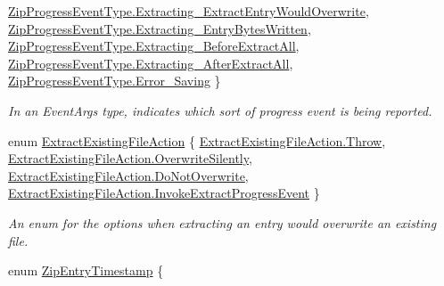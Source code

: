 \begin{DoxyCompactItemize}
\mbox{\hyperlink{namespace_super_tiled2_unity_1_1_ionic_1_1_zip_a6584db8196e626ddfc455e74d31a841faf76e96e54af22ba88a1e180a9c935f05}{Zip\+Progress\+Event\+Type.\+Extracting\+\_\+\+Extract\+Entry\+Would\+Overwrite}}, 
\newline
\mbox{\hyperlink{namespace_super_tiled2_unity_1_1_ionic_1_1_zip_a6584db8196e626ddfc455e74d31a841fab1d6fef4a55c43c15713a126b8471092}{Zip\+Progress\+Event\+Type.\+Extracting\+\_\+\+Entry\+Bytes\+Written}}, 
\mbox{\hyperlink{namespace_super_tiled2_unity_1_1_ionic_1_1_zip_a6584db8196e626ddfc455e74d31a841fa36adf3f25d454b09928980646e2459d6}{Zip\+Progress\+Event\+Type.\+Extracting\+\_\+\+Before\+Extract\+All}}, 
\mbox{\hyperlink{namespace_super_tiled2_unity_1_1_ionic_1_1_zip_a6584db8196e626ddfc455e74d31a841fa89f4cb8811e15be571ff87cfd6687158}{Zip\+Progress\+Event\+Type.\+Extracting\+\_\+\+After\+Extract\+All}}, 
\mbox{\hyperlink{namespace_super_tiled2_unity_1_1_ionic_1_1_zip_a6584db8196e626ddfc455e74d31a841fa6d93d77ba4439ec2a5bf59f7282b906f}{Zip\+Progress\+Event\+Type.\+Error\+\_\+\+Saving}}
 \}
\begin{DoxyCompactList}\small\item\em In an Event\+Args type, indicates which sort of progress event is being reported. \end{DoxyCompactList}\item 
enum \mbox{\hyperlink{namespace_super_tiled2_unity_1_1_ionic_1_1_zip_a3f8db7242d746d36b45114257b4fe4c0}{Extract\+Existing\+File\+Action}} \{ \mbox{\hyperlink{namespace_super_tiled2_unity_1_1_ionic_1_1_zip_a3f8db7242d746d36b45114257b4fe4c0a8ce61dd2505effd96f937fa743b6491f}{Extract\+Existing\+File\+Action.\+Throw}}, 
\mbox{\hyperlink{namespace_super_tiled2_unity_1_1_ionic_1_1_zip_a3f8db7242d746d36b45114257b4fe4c0aa79e43bcce2e13d7d7f88ad674daf33c}{Extract\+Existing\+File\+Action.\+Overwrite\+Silently}}, 
\mbox{\hyperlink{namespace_super_tiled2_unity_1_1_ionic_1_1_zip_a3f8db7242d746d36b45114257b4fe4c0a80333c1a464b4e4f50e71e8b923931ca}{Extract\+Existing\+File\+Action.\+Do\+Not\+Overwrite}}, 
\mbox{\hyperlink{namespace_super_tiled2_unity_1_1_ionic_1_1_zip_a3f8db7242d746d36b45114257b4fe4c0a260afa558b9392c717b397a63c86e1fe}{Extract\+Existing\+File\+Action.\+Invoke\+Extract\+Progress\+Event}}
 \}
\begin{DoxyCompactList}\small\item\em An enum for the options when extracting an entry would overwrite an existing file. \end{DoxyCompactList}\item 
enum \mbox{\hyperlink{namespace_super_tiled2_unity_1_1_ionic_1_1_zip_afa5034d6b4915c0633b590a28622f7fd}{Zip\+Entry\+Timestamp}} \{ \newline

\end{DoxyCompactItemize}
